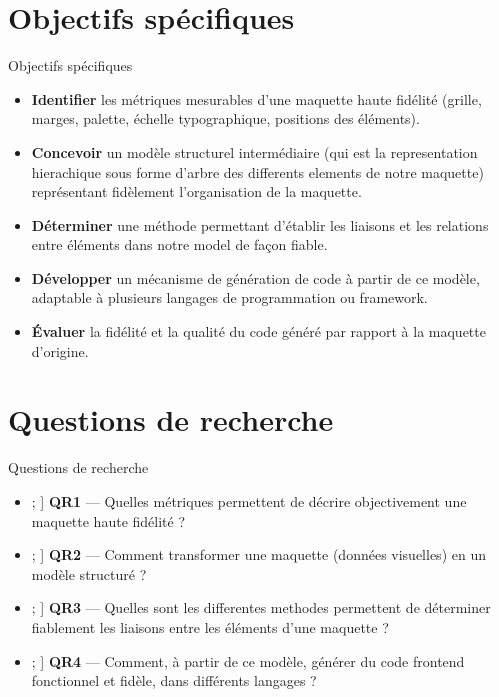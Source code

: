 \documentclass[11pt]{beamer}
\newcommand{\circnum}[1]{%
  \tikz[baseline=-0.6ex]\node[circle,fill=navy,text=white,font=\bfseries\small,inner sep=1.6pt]{#1};%
}
\begin{document}
\section{Objectifs spécifiques}
\begin{frame}{Objectifs spécifiques}
  \begin{itemize}
    \setlength{\itemsep}{0.6em}
    \item[\textbf{1.}] \textbf{Identifier} les  métriques mesurables d'une
      maquette haute fidélité (grille, marges, palette, échelle typographique,
      positions des éléments).
    \item[\textbf{2.}] \textbf{Concevoir} un modèle structurel intermédiaire (qui est la representation hierachique sous forme d'arbre des differents elements de notre maquette) représentant fidèlement l'organisation de la maquette.
    \item[\textbf{3.}] \textbf{Déterminer} une méthode permettant d'établir les liaisons et les relations entre éléments dans notre model de façon fiable.
    \item[\textbf{4.}] \textbf{Développer} un mécanisme de génération de code à partir de ce
      modèle, adaptable à plusieurs langages de programmation ou framework.
    \item[\textbf{5.}] \textbf{Évaluer} la fidélité et la qualité du code généré par rapport à la
      maquette d'origine.
  \end{itemize}
\end{frame}

\section{Questions de recherche}
\begin{frame}{Questions de recherche}
  \begin{itemize}[leftmargin=1.4em, itemsep=0.9em]
    \item[\circnum{1}] \textbf{QR1} — Quelles  métriques
      permettent de décrire objectivement une maquette haute fidélité ?
    \item[\circnum{2}] \textbf{QR2} — Comment transformer une maquette (données
      visuelles) en un modèle structuré  ?
    \item[\circnum{3}] \textbf{QR3} — Quelles sont les differentes methodes permettent de déterminer fiablement les liaisons entre les
      éléments d'une maquette ?
    \item[\circnum{4}] \textbf{QR4} — Comment, à partir de ce modèle, générer du
      code frontend fonctionnel et fidèle, dans différents langages ?
  \end{itemize}
  \vspace{0.8em}
\end{frame}
\end{document}
